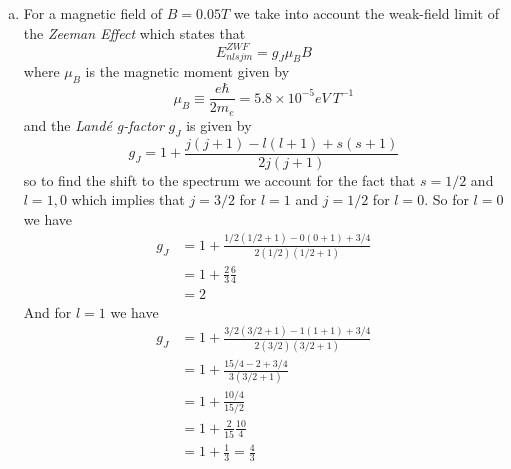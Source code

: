 \documentclass[11pt]{article}
\numberwithin{equation}{section}
\begin{document}
\begin{enumerate}[(a)]
\item
For a magnetic field of $B=0.05\unit{T}$ we take into account the weak-field limit of the \emph{Zeeman Effect} which states that
$$E^{ZWF}_{nlsjm} = g_J\mu_BB$$
where $\mu_B$ is the magnetic moment given by
$$\mu_B \equiv \frac{e\hbar}{2m_e} = 5.8\times10^{-5}\unit{eV\ T^{-1}}$$
and the \emph{Land\'{e} g-factor} $g_J$ is given by
$$g_J = 1+\frac{j(j+1)-l(l+1)+s(s+1)}{2j(j+1)}$$
so to find the shift to the spectrum we account for the fact that $s=1/2$ and $l=1,0$ which implies that $j=3/2$ for $l=1$ and $j=1/2$ for $l=0$. So for $l=0$ we have
\begin{align*}
g_J &= 1+\frac{1/2(1/2+1)-0(0+1)+3/4}{2(1/2)(1/2+1)}\\
&= 1+\frac{2}{3}\frac{6}{4}\\
&= 2
\end{align*}
And for $l=1$ we have
\begin{align*}
g_J &= 1+\frac{3/2(3/2+1)-1(1+1)+3/4}{2(3/2)(3/2+1)}\\
&= 1+\frac{15/4-2+3/4}{3(3/2+1)}\\
&= 1+\frac{10/4}{15/2}\\
&= 1+\frac{2}{15}\frac{10}{4}\\
&= 1+\frac{1}{3} = \frac{4}{3}
\end{align*}
\end{enumerate}
\end{document}
